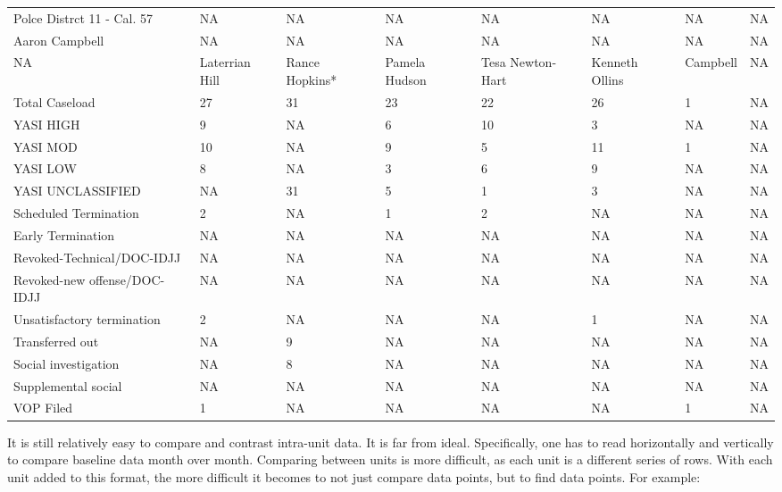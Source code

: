 \documentclass[12pt,]{article}
\begin{document}
\begin{table}[!h]
{\begin{tabular}[t]{llllllll}
Polce Distrct 11 - Cal. 57 & NA & NA & NA & NA & NA & NA & NA\\
\addlinespace
Aaron Campbell & NA & NA & NA & NA & NA & NA & NA\\
NA & Laterrian Hill & Rance Hopkins* & Pamela Hudson & Tesa Newton-Hart & Kenneth Ollins & Campbell & NA\\
Total Caseload & 27 & 31 & 23 & 22 & 26 & 1 & NA\\
YASI HIGH & 9 & NA & 6 & 10 & 3 & NA & NA\\
YASI MOD & 10 & NA & 9 & 5 & 11 & 1 & NA\\
\addlinespace
YASI LOW & 8 & NA & 3 & 6 & 9 & NA & NA\\
YASI UNCLASSIFIED & NA & 31 & 5 & 1 & 3 & NA & NA\\
Scheduled Termination & 2 & NA & 1 & 2 & NA & NA & NA\\
Early Termination & NA & NA & NA & NA & NA & NA & NA\\
Revoked-Technical/DOC-IDJJ & NA & NA & NA & NA & NA & NA & NA\\
\addlinespace
Revoked-new offense/DOC-IDJJ & NA & NA & NA & NA & NA & NA & NA\\
Unsatisfactory termination & 2 & NA & NA & NA & 1 & NA & NA\\
Transferred out & NA & 9 & NA & NA & NA & NA & NA\\
Social investigation & NA & 8 & NA & NA & NA & NA & NA\\
Supplemental social & NA & NA & NA & NA & NA & NA & NA\\
VOP Filed & 1 & NA & NA & NA & NA & 1 & NA\\
\bottomrule
\end{tabular}}
\end{table}

\newpage

It is still relatively easy to compare and contrast intra-unit data. It
is far from ideal. Specifically, one has to read horizontally and
vertically to compare baseline data month over month. Comparing between
units is more difficult, as each unit is a different series of rows.
With each unit added to this format, the more difficult it becomes to
not just compare data points, but to find data points. For example:
\end{document}
